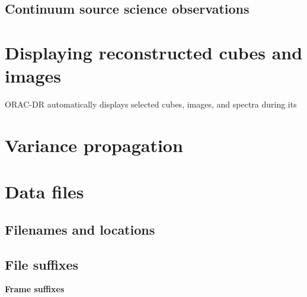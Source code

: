 \documentclass[twoside,11pt]{article}
\renewcommand{\_}{\texttt{\symbol{95}}}
\begin{document}
\subsection{Continuum source science observations}

\section{Displaying reconstructed cubes and images}

ORAC-DR automatically displays selected cubes, images, and spectra during its

\section{Variance propagation}

\section{Data files}

\subsection{Filenames and locations}

\subsection{File suffixes}

\textbf{Frame suffixes}

\vspace{0.2cm}
\end{document}
